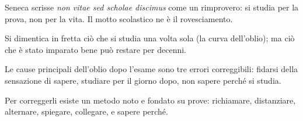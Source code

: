 \begin{sintesi}
  \item Seneca scrisse \emph{non vitae sed scholae discimus} come un
        rimprovero: si studia per la prova, non per la vita. Il motto
        scolastico ne è il rovesciamento.
  \item Si dimentica in fretta ciò che si studia una volta sola (la
        curva dell'oblio); ma ciò che è stato imparato bene può restare
        per decenni.
  \item Le cause principali dell'oblio dopo l'esame sono tre errori
        correggibili: fidarsi della sensazione di sapere, studiare per
        il giorno dopo, non sapere perché si studia.
  \item Per correggerli esiste un metodo noto e fondato su prove:
        richiamare, distanziare, alternare, spiegare, collegare, e
        sapere perché.
\end{sintesi}

\finecapitolo

